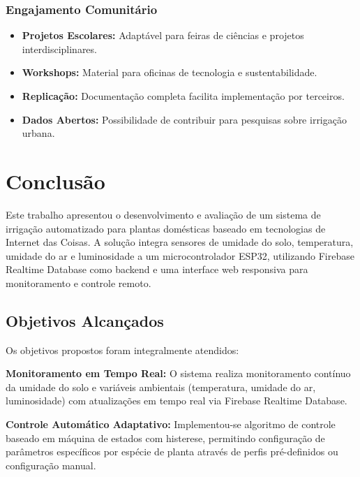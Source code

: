 \subsection{Engajamento Comunitário}
\begin{itemize}
    \item \textbf{Projetos Escolares:} Adaptável para feiras de ciências e projetos interdisciplinares.
    \item \textbf{Workshops:} Material para oficinas de tecnologia e sustentabilidade.
    \item \textbf{Replicação:} Documentação completa facilita implementação por terceiros.
    \item \textbf{Dados Abertos:} Possibilidade de contribuir para pesquisas sobre irrigação urbana.
\end{itemize}

\chapter{Conclusão}

Este trabalho apresentou o desenvolvimento e avaliação de um sistema de irrigação automatizado para plantas domésticas baseado em tecnologias de Internet das Coisas. A solução integra sensores de umidade do solo, temperatura, umidade do ar e luminosidade a um microcontrolador ESP32, utilizando Firebase Realtime Database como backend e uma interface web responsiva para monitoramento e controle remoto.

\section{Objetivos Alcançados}

Os objetivos propostos foram integralmente atendidos:

\textbf{Monitoramento em Tempo Real:} O sistema realiza monitoramento contínuo da umidade do solo e variáveis ambientais (temperatura, umidade do ar, luminosidade) com atualizações em tempo real via Firebase Realtime Database.

\textbf{Controle Automático Adaptativo:} Implementou-se algoritmo de controle baseado em máquina de estados com histerese, permitindo configuração de parâmetros específicos por espécie de planta através de perfis pré-definidos ou configuração manual.

